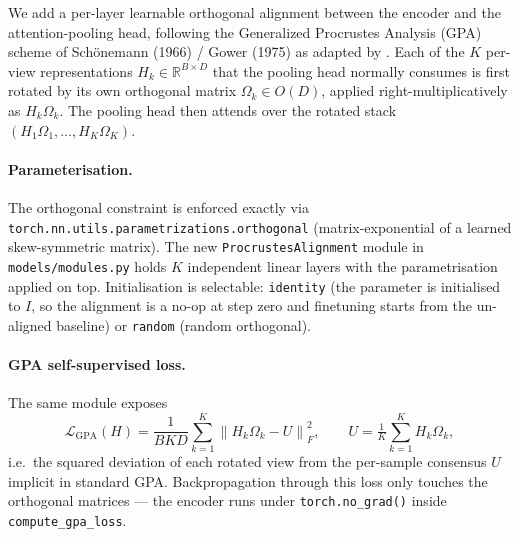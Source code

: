\documentclass{article}
\newcommand{\norm}[1]{\left \lVert #1 \right \rVert}
\begin{document}
We add a per-layer learnable orthogonal alignment between the encoder
and the attention-pooling head, following the Generalized Procrustes
Analysis (GPA) scheme of Sch\"onemann (1966) / Gower (1975) as adapted
by \citet{arxiv:2602.06205}. Each of the $K$ per-view representations
$H_k \in \mathbb{R}^{B\times D}$ that the pooling head normally
consumes is first rotated by its own orthogonal matrix
$\Omega_k \in O(D)$, applied right-multiplicatively as $H_k\Omega_k$.
The pooling head then attends over the rotated stack
$(H_1\Omega_1,\dots,H_K\Omega_K)$.

\paragraph{Parameterisation.}
The orthogonal constraint is enforced exactly via
\texttt{torch.nn.utils.parametrizations.orthogonal} (matrix-exponential
of a learned skew-symmetric matrix). The new
\texttt{ProcrustesAlignment} module in \texttt{models/modules.py}
holds $K$ independent linear layers with the parametrisation applied
on top. Initialisation is selectable: \texttt{identity} (the
parameter is initialised to $I$, so the alignment is a no-op at step
zero and finetuning starts from the un-aligned baseline) or
\texttt{random} (random orthogonal).

\paragraph{GPA self-supervised loss.}
The same module exposes
\[
  \mathcal{L}_{\text{GPA}}(H)
  = \frac{1}{B K D}\sum_{k=1}^{K}\norm{H_k\Omega_k - U}_F^2,
  \qquad
  U = \tfrac{1}{K}\sum_{k=1}^{K} H_k\Omega_k,
\]
i.e.\ the squared deviation of each rotated view from the per-sample
consensus $U$ implicit in standard GPA. Backpropagation through this
loss only touches the orthogonal matrices --- the encoder runs under
\texttt{torch.no\_grad()} inside \texttt{compute\_gpa\_loss}.
\end{document}
